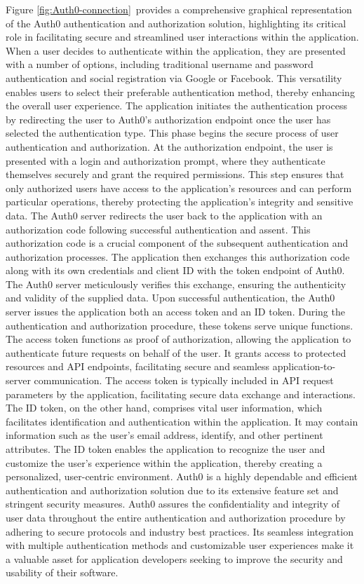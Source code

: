 \documentclass[../Main.tex]{subfiles}
\begin{document}
Figure \ref{fig:Auth0-connection} provides a comprehensive graphical representation of the Auth0 authentication and authorization solution, highlighting its critical role in facilitating secure and streamlined user interactions within the application. When a user decides to authenticate within the application, they are presented with a number of options, including traditional username and password authentication and social registration via Google or Facebook. This versatility enables users to select their preferable authentication method, thereby enhancing the overall user experience. The application initiates the authentication process by redirecting the user to Auth0's authorization endpoint once the user has selected the authentication type. This phase begins the secure process of user authentication and authorization. At the authorization endpoint, the user is presented with a login and authorization prompt, where they authenticate themselves securely and grant the required permissions. This step ensures that only authorized users have access to the application's resources and can perform particular operations, thereby protecting the application's integrity and sensitive data. The Auth0 server redirects the user back to the application with an authorization code following successful authentication and assent. This authorization code is a crucial component of the subsequent authentication and authorization processes. The application then exchanges this authorization code along with its own credentials and client ID with the token endpoint of Auth0. The Auth0 server meticulously verifies this exchange, ensuring the authenticity and validity of the supplied data. Upon successful authentication, the Auth0 server issues the application both an access token and an ID token. During the authentication and authorization procedure, these tokens serve unique functions. The access token functions as proof of authorization, allowing the application to authenticate future requests on behalf of the user. It grants access to protected resources and API endpoints, facilitating secure and seamless application-to-server communication. The access token is typically included in API request parameters by the application, facilitating secure data exchange and interactions. The ID token, on the other hand, comprises vital user information, which facilitates identification and authentication within the application. It may contain information such as the user's email address, identify, and other pertinent attributes. The ID token enables the application to recognize the user and customize the user's experience within the application, thereby creating a personalized, user-centric environment. Auth0 is a highly dependable and efficient authentication and authorization solution due to its extensive feature set and stringent security measures. Auth0 assures the confidentiality and integrity of user data throughout the entire authentication and authorization procedure by adhering to secure protocols and industry best practices. Its seamless integration with multiple authentication methods and customizable user experiences make it a valuable asset for application developers seeking to improve the security and usability of their software.
\end{document}
